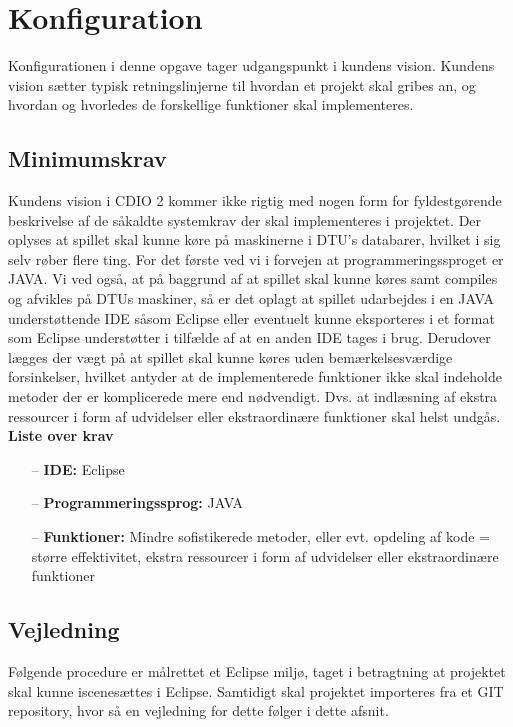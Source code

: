 \chapter{Konfiguration}

Konfigurationen i denne opgave tager udgangspunkt i kundens vision. Kundens vision sætter typisk retningslinjerne til hvordan et projekt skal gribes an, og hvordan og hvorledes de forskellige funktioner skal implementeres.

\section{Minimumskrav}

Kundens vision i CDIO 2 kommer ikke rigtig med nogen form for fyldestgørende beskrivelse af de såkaldte systemkrav der skal implementeres i projektet. 
Der oplyses at spillet skal kunne køre på maskinerne i DTU’s databarer, hvilket i sig selv røber flere ting.
For det første ved vi i forvejen at programmeringssproget er JAVA. 
Vi ved også, at på baggrund af at spillet skal kunne køres samt compiles og afvikles på DTUs maskiner, så er det oplagt at spillet udarbejdes i en JAVA understøttende IDE såsom Eclipse eller eventuelt kunne eksporteres i et format som Eclipse understøtter i tilfælde af at en anden IDE tages i brug. 
Derudover lægges der vægt på at spillet skal kunne køres uden bemærkelsesværdige forsinkelser, hvilket antyder at de implementerede funktioner ikke skal indeholde metoder der er komplicerede mere end nødvendigt. 
Dvs. at indlæsning af ekstra ressourcer i form af udvidelser eller ekstraordinære funktioner skal helst undgås.
\\

\noindent \textbf{Liste over krav}
\begin{itemize}
    \item[--] \textbf{IDE:} Eclipse
    \item[--] \textbf{Programmeringssprog:} JAVA
    \item[--] \textbf{Funktioner:} Mindre sofistikerede metoder, eller evt. opdeling af kode = større effektivitet, ekstra ressourcer i form af udvidelser eller ekstraordinære funktioner
\end{itemize}

\section{Vejledning}

Følgende procedure er målrettet et Eclipse miljø, taget i betragtning at projektet skal kunne iscenesættes i Eclipse. Samtidigt skal projektet importeres fra et GIT repository, hvor så en vejledning for dette følger i dette afsnit.\\

